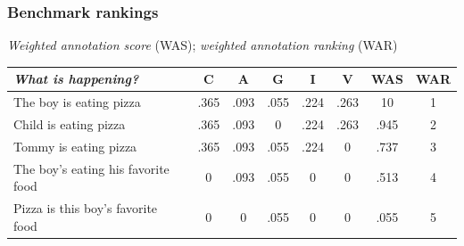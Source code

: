 \documentclass[handout,xcolor={dvipsnames}]{beamer}
\begin{document}
\begin{frame}
\frametitle{Benchmark rankings}
\small


\vspace{.8em}
\textit{Weighted annotation score} (WAS); \textit{weighted annotation ranking} (WAR) \\
\begin{footnotesize}
\vspace{-.5em}
\begin{table}[htb!]
\begin{center}
\begin{tabular}{|p{2.7cm}||c|c|c|c|c|c|c|}
\hline
\textit{What is happening?} & C & A & G & I & V & WAS & WAR \\
\hline
\hline
The boy is eating pizza & .365 & .093 & .055 & .224 & .263 & 10 & 1 \\
\hline
Child is eating pizza & .365 & .093 & 0 & .224 & .263 & .945 & 2 \\
\hline
Tommy is eating pizza & .365 & .093 & .055 & .224 & 0 & .737 & 3 \\
\hline
The boy's eating his favorite food & 0 & .093 & .055 & 0 & 0 & .513 & 4 \\
\hline
Pizza is this boy's favorite food & 0 & 0 & .055 & 0 & 0 & .055 & 5 \\
\hline
\end{tabular}
\end{center}
\end{table}
\end{footnotesize}

\vspace{1em}


\end{frame}
\end{document}
